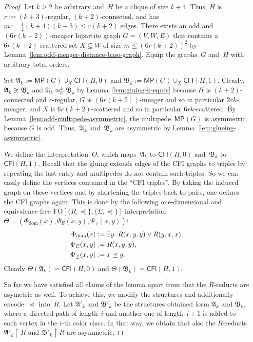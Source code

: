 \documentclass[]{lmcs}
\newcommand{\iso}{\cong}
\newcommand{\qspace}{\mathchoice{\;}{\,}{}{}}
\newcommand{\set}[1]{\lbrace #1 \rbrace}
\newcommand{\formA}{\Phi}
\newcommand{\formB}{\Psi}
\newcommand{\interpret}{\Theta}
\newcommand{\spleq}{\preceq}
\newcommand{\StructA}{\mathfrak{A}}
\newcommand{\StructB}{\mathfrak{B}}
\newcommand{\reduct}[2]{#1 \upharpoonright #2}
\newcommand{\FO}{\ensuremath{\mathrm{FO}}}
\newcommand{\CFIsym}{\mathsf{CFI}}
\newcommand{\CFI}[1]{\CFIsym(#1)}
\newcommand{\multipede}[1]{\mathsf{MP}(#1)}
\newcommand{\gadgetsb}{V}
\newcommand{\feetb}{W}
\newcommand{\footbset}{X}
\newcommand{\gluing}[3]{#1 \cup_#2 #3}
\newcommand{\kequiv}[1]{\simeq^#1_{\mathcal{C}}}
\begin{document}
\begin{proof}
	
	Let $k \geq 2$ be arbitrary and~$H$ be a clique of size $k+4$.
	Thus, $H$ is $r:=(k+3)$-regular, $(k+2)$-connected, and has $m:=\frac{1}{2}(k+4)(k+3)\leq r(k+2)$ edges.
	There exists an odd and $(6r(k+2))$-meager bipartite graph $G=(\gadgetsb,\feetb, E)$
	that contains a $6r(k+2)$-scattered set $\footbset \subseteq \feetb$ of size $m \leq (6r(k+2))^2$ by Lemma~\ref{lem:odd-meager-distance-base-graph}.
	Equip the graphs~$G$ and~$H$ with arbitrary total orders.
	
	Set $\StructA_k := \gluing{\multipede{G}}{\footbset}{\CFI{H,0}}$
	and $\StructB_k := \gluing{\multipede{G}}{\footbset}{\CFI{H,1}}$.
	Clearly, $\StructA_k \not\iso \StructB_k$
	and $\StructA_k \kequiv{k} \StructB_k$ by Lemma~\ref{lem:gluing-k-equiv}
	because $H$ is $(k+2)$-connected and $r$-regular, $G$ is
	 $(6r(k+2))$-meager and so in particular $2rk$-meager,
	and $\footbset$ is $6r(k+2)$-scattered and so in particular $6rk$-scattered.
	By Lemma~\ref{lem:odd-multipede-asymmetric},
	the multipede~$\multipede{G}$ is asymmetric because $G$ is odd.
	Thus,~$\StructA_k$ and~$\StructB_k$ are asymmetric by Lemma~\ref{lem:glueing-asymmetric}.
	
	We define the interpretation~$\interpret$,
	which maps~$\StructA_k$ to $\CFI{H,0}$ and~$\StructB_k$ to $\CFI{H,1}$.  
	Recall that the gluing extends edges of the CFI graphs to triples by repeating the last entry and multipedes do not contain such triples.
	So we can easily define the vertices contained in the ``CFI triples''.
	By taking the induced graph on these vertices
	and by shortening the triples back to pairs,
	one defines the CFI graphs again.
	This is done by the following one-dimensional and equivalence-free $\FO[\set{R,\spleq},\set{E,\spleq}]$-interpretation $\interpret = (\formA_{\text{dom}}(x), \formB_E(x,y), \formB_{\spleq}(x,y))$:
	\begin{align*}
		\formA_{\text{dom}}(x) &:= \exists y.\qspace R(x,y,y)\lor R(y,x,x), \\
		\formB_E(x,y) &:= R(x,y,y),\\
		\formB_{\spleq}(x,y) & := x \spleq y.
	\end{align*}
	Clearly
	$\interpret(\StructA_k) = \CFI{H,0}$ and 
	$\interpret(\StructB_k) = \CFI{H,1}$.
	
	So far we have satisfied all claims of the lemma apart from that the $R$-reducts are asymetric as well.
	To achieve this, we modify the structures and additionally encode~$\spleq$ into~$R$.
	Let $\StructA'_k$ and $\StructB'_k$ be the structures
	obtained form $\StructA_k$ and $\StructB_k$,
	where a directed path of length~$i$ and another one of length~$i+1$ is added to each vertex in the $i$-th color class.
	In that way,
	we obtain that also the $R$-reducts $\reduct{\StructA'_k}{R}$ and $\reduct{\StructB'_k}{R}$ are asymmetric.
	

\end{proof}
\end{document}
